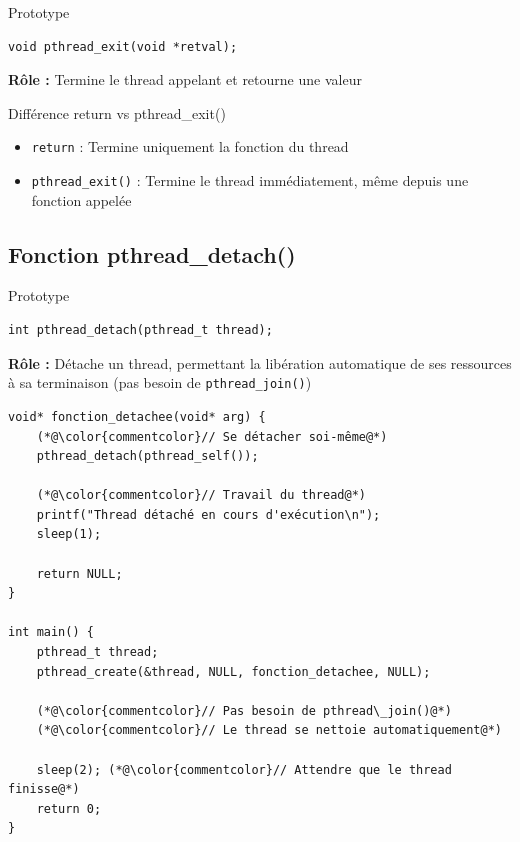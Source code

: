 \documentclass[11pt,a4paper]{article}
\begin{document}
\begin{definitionbox}{Prototype}
\begin{verbatim}
void pthread_exit(void *retval);
\end{verbatim}
\end{definitionbox}

\textbf{Rôle :} Termine le thread appelant et retourne une valeur

\begin{importantbox}{Différence return vs pthread\_exit()}
\begin{itemize}
    \item \texttt{return} : Termine uniquement la fonction du thread
    \item \texttt{pthread\_exit()} : Termine le thread immédiatement, même depuis une fonction appelée
\end{itemize}
\end{importantbox}

\subsection{Fonction pthread\_detach()}

\begin{definitionbox}{Prototype}
\begin{verbatim}
int pthread_detach(pthread_t thread);
\end{verbatim}
\end{definitionbox}

\textbf{Rôle :} Détache un thread, permettant la libération automatique de ses ressources à sa terminaison (pas besoin de \texttt{pthread\_join()})

\begin{lstlisting}[caption={Utilisation de pthread\_detach()}]
void* fonction_detachee(void* arg) {
    (*@\color{commentcolor}// Se détacher soi-même@*)
    pthread_detach(pthread_self());
    
    (*@\color{commentcolor}// Travail du thread@*)
    printf("Thread détaché en cours d'exécution\n");
    sleep(1);
    
    return NULL;
}

int main() {
    pthread_t thread;
    pthread_create(&thread, NULL, fonction_detachee, NULL);
    
    (*@\color{commentcolor}// Pas besoin de pthread\_join()@*)
    (*@\color{commentcolor}// Le thread se nettoie automatiquement@*)
    
    sleep(2); (*@\color{commentcolor}// Attendre que le thread finisse@*)
    return 0;
}
\end{lstlisting}
\end{document}
